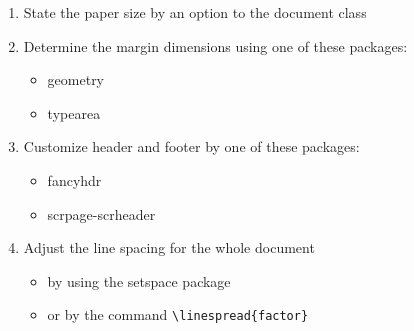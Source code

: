 \documentclass{article}
\begin{document}
\begin{enumerate}
  \item State the paper size by an option to the
        document class
  \item Determine the margin dimensions using one of
        these packages:
    \begin{itemize}
    \item geometry
    \item typearea
  \end{itemize}
  \item Customize header and footer by one of these
        packages:
  \begin{itemize}
    \item fancyhdr
    \item scrpage-scrheader
  \end{itemize}
  \item Adjust the line spacing for the whole document
  \begin{itemize}
    \item by using the setspace package
    \item or by the command \verb|\linespread{factor}|
  \end{itemize}
\end{enumerate}
\end{document}
